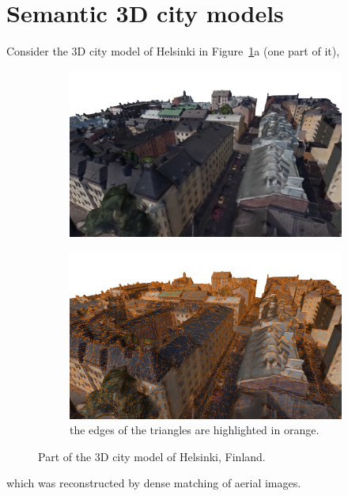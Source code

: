 %
\section{Semantic 3D city models}

Consider the 3D city model of Helsinki in Figure~\ref{fig:mesh}a (one part of it),
\begin{figure}
  \centering
  \begin{subfigure}[b]{0.8\linewidth}
    \centering
    \includegraphics[width=\textwidth]{figs/mesh01.png}
    \caption{}
  \end{subfigure}
  \begin{subfigure}[b]{0.8\linewidth}
    \centering
    \includegraphics[width=\textwidth]{figs/mesh04.png}
    \caption{the edges of the triangles are highlighted in orange.}
  \end{subfigure}
\caption{Part of the 3D city model of Helsinki, Finland.}%
\label{fig:mesh}
\end{figure}
which was reconstructed by dense matching of aerial images.

